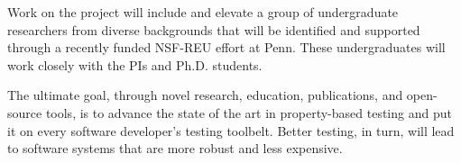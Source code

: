 Work on the project will include and elevate a group of undergraduate
researchers from
diverse backgrounds that will be identified and supported through
a recently funded NSF-REU effort at Penn. These
undergraduates will work closely with the PIs and Ph.D.{} students.

The ultimate goal, through novel research, education, publications, and open-source
tools, is to advance the state of the art in property-based testing
and put it on every
software developer's testing toolbelt.  Better testing, in turn, will
lead to software systems that are more robust and less expensive.


